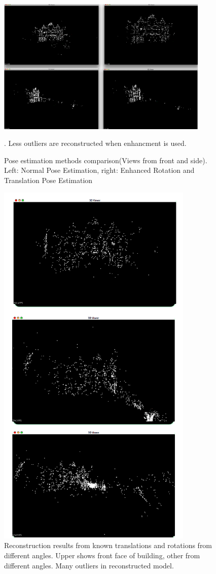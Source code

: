 \begin{figure}[p]
    \centering
    \includegraphics[width=0.9\textwidth]{PoseEstimationMethodComparison}
    \caption{Pose estimation methods comparison(Views from front and side). Left: Normal Pose Estimation, right: Enhanced Rotation and Translation Pose Estimation}. Less outliers are reconstructed when enhancment is used.
    \label{fig:PoseEstimationMethodComparison}
\end{figure}
\begin{figure}[p]
    \centering
    \includegraphics[height=18cm]{uniNone4000}
    \caption{Reconstruction results from known translations and rotations from different angles. Upper shows front face of building, other from different angles. Many outliers in reconstructed model.}
    \label{fig:UniNone4000}
\end{figure}

